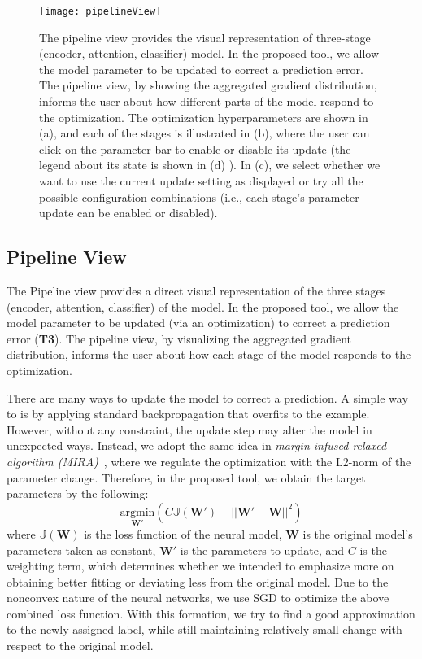 \begin{figure}[htbp]
\centering
\vspace{-2mm}
 \texttt{[image: pipelineView]}
 \vspace{-6mm}
 \caption{
 The pipeline view provides the visual representation of three-stage (encoder, attention, classifier) model. In the proposed tool, we allow the model parameter to be updated to correct a prediction error. The pipeline view, by showing the aggregated gradient distribution, informs the user about how different parts of the model respond to the optimization.
 The optimization hyperparameters are shown in (a), and each of the stages is illustrated in (b), where the user can click on the parameter bar to enable or disable its update (the legend about its state is shown in (d) ). In (c), we select whether we want to use the current update setting as displayed or try all the possible configuration combinations (i.e., each stage's parameter update can be enabled or disabled).
 }
\label{fig:pipelineView}
\vspace{-2mm}
\end{figure}

\subsection{Pipeline View}
\label{sec:pipeline}
The Pipeline view provides a direct visual representation of the three stages (encoder, attention, classifier) of the model. In the proposed tool, we allow the model parameter to be updated (via an optimization) to correct a prediction error (\textbf{T3}). The pipeline view, by visualizing the aggregated gradient distribution, informs the user about how each stage of the model responds to the optimization.

There are many ways to update the model to correct a prediction. A simple way to is by applying standard backpropagation that overfits to the example. However, without any constraint, the update step may alter the model in unexpected ways.
Instead, we adopt the same idea in \emph{margin-infused relaxed algorithm (MIRA)}~\cite{CrammerSinger2003}, where we regulate the optimization with the L2-norm of the parameter change. Therefore, in the proposed tool, we obtain the target parameters by the following:
\begin{equation}
\underset{\mathbf{W}'}{\mathrm{argmin}}( C \mathbb{J}(\mathbf{W}') + ||\mathbf{W}' - \mathbf{W}||^2)
\end{equation}
where $\mathbb{J}(\mathbf{W})$ is the loss function of the neural model, $\mathbf{W}$ is the original model's parameters taken as constant, $\mathbf{W}'$ is the parameters to update, and $C$ is the weighting term, which determines whether we intended to emphasize more on obtaining better fitting or deviating less from the original model. Due to the nonconvex nature of the neural networks, we use SGD to optimize the above combined loss function.
%
With this formation, we try to find a good approximation to the newly assigned label, while still maintaining relatively small change with respect to the original model.

